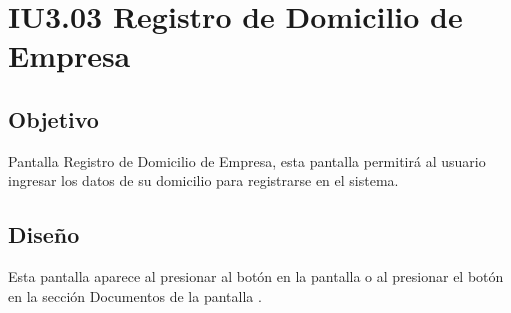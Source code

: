 \newpage
\section{IU3.03 Registro de Domicilio de Empresa}

\subsection{Objetivo}
	Pantalla Registro de Domicilio de Empresa, esta pantalla permitirá al usuario ingresar los datos de su domicilio para registrarse en el sistema.
	


\subsection{Diseño}
    Esta pantalla aparece al presionar al botón  en la pantalla  o al presionar el botón  en la sección Documentos de la pantalla .

	
